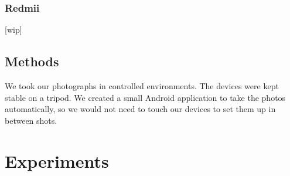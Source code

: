 \subsection{Redmii}
[wip]

\section{Methods}
We took our photographs in controlled environments.
The devices were kept stable on a tripod.
We created a small Android application to take the photos automatically, so we would not need to touch our devices to set them up in between shots.


\chapter{Experiments}

\section{}


